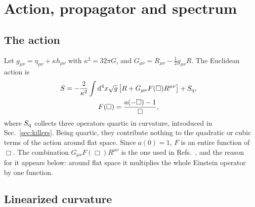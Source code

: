 \documentclass[aps,prd,10pt,twocolumn,superscriptaddress,nofootinbib,floatfix,longbibliography]{revtex4-2}
\newcommand{\dd}{\mathrm{d}}
\begin{document}
\section{Action, propagator and spectrum}
\label{sec:action}

\subsection{The action}

Let $g_{\mu\nu}=\eta_{\mu\nu}+\kappa h_{\mu\nu}$ with $\kappa^2=32\pi G$, and $G_{\mu\nu}=R_{\mu\nu}-\frac12g_{\mu\nu}R$. The Euclidean action is
\begin{multline}
\label{eq:action}
S=-\frac2{\kappa^2}\int\dd^4x\sqrt g\,\bigl[R+G_{\mu\nu}F(\Box)R^{\mu\nu}\bigr]+S_{\rm q},\\
F(\Box)=\frac{a(-\Box)-1}{\Box},
\end{multline}
where $S_{\rm q}$ collects three operators quartic in curvature, introduced in Sec.~\ref{sec:killers}. Being quartic, they contribute nothing to the quadratic or cubic terms of the action around flat space. Since $a(0)=1$, $F$ is an entire function of $\Box$. The combination $G_{\mu\nu}F(\Box)R^{\mu\nu}$ is the one used in Refs.~\cite{Tomboulis1997,Modesto2012}, and the reason for it appears below: around flat space it multiplies the whole Einstein operator by one function.

\subsection{Linearized curvature}
\end{document}
